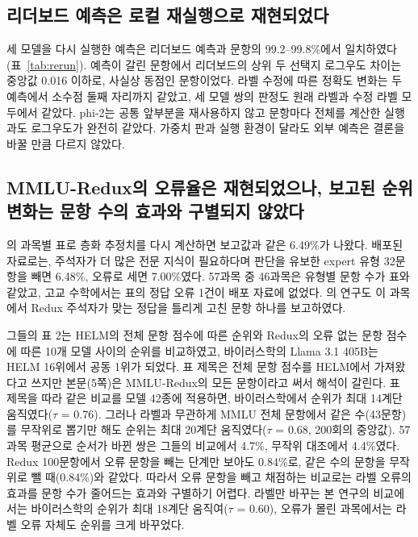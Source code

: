 \documentclass[11pt]{article}
\begin{document}
\subsection{리더보드 예측은 로컬 재실행으로 재현되었다}

\begin{table}[t]
\centering\small\setlength{\tabcolsep}{3.5pt}

\caption{리더보드 예측과 로컬 재실행 예측(5,690문항, float16, Apple 실리콘 GPU). 예측 일치는 로그우도가 가장 큰 선택지가 같은 문항의 비율, 로그우도 차이는 네 선택지 로그우도 차이의 절댓값 중앙값이다. 수정 후 변화는 $S$에서 수정 정답과 원래 정답 기준 정확도의 차이이다.}
\label{tab:rerun}
\end{table}

세 모델을 다시 실행한 예측은 리더보드 예측과 문항의 99.2--99.8\%에서 일치하였다(표~\ref{tab:rerun}). 예측이 갈린 문항에서 리더보드의 상위 두 선택지 로그우도 차이는 중앙값 0.016 이하로, 사실상 동점인 문항이었다. 라벨 수정에 따른 정확도 변화는 두 예측에서 소수점 둘째 자리까지 같았고, 세 모델 쌍의 판정도 원래 라벨과 수정 라벨 모두에서 같았다. phi-2는 공통 앞부분을 재사용하지 않고 문항마다 전체를 계산한 실행과도 로그우도가 완전히 같았다. 가중치 판과 실행 환경이 달라도 외부 예측은 결론을 바꿀 만큼 다르지 않았다.

\subsection{MMLU-Redux의 오류율은 재현되었으나, 보고된 순위 변화는 문항 수의 효과와 구별되지 않았다}

\citet{gema-etal-2025-done}의 과목별 표로 층화 추정치를 다시 계산하면 보고값과 같은 6.49\%가 나왔다. 배포된 자료로는, 주석자가 더 많은 전문 지식이 필요하다며 판단을 유보한 expert 유형 32문항을 빼면 6.48\%, 오류로 세면 7.00\%였다. 57과목 중 46과목은 유형별 문항 수가 표와 같았고, 고교 수학에서는 표의 정답 오류 1건이 배포 자료에 없었다. \citet{vendrow2025platinum}의 연구도 이 과목에서 Redux 주석자가 맞는 정답을 틀리게 고친 문항 하나를 보고하였다.

그들의 표 2는 HELM의 전체 문항 점수에 따른 순위와 Redux의 오류 없는 문항 점수에 따른 10개 모델 사이의 순위를 비교하였고, 바이러스학의 Llama 3.1 405B는 HELM 16위에서 공동 1위가 되었다. 표 제목은 전체 문항 점수를 HELM에서 가져왔다고 쓰지만 본문(5쪽)은 MMLU-Redux의 모든 문항이라고 써서 해석이 갈린다. 표 제목을 따라 같은 비교를 모델 42종에 적용하면, 바이러스학에서 순위가 최대 14계단 움직였다($\tau$ = 0.76). 그러나 라벨과 무관하게 MMLU 전체 문항에서 같은 수(43문항)를 무작위로 뽑기만 해도 순위는 최대 20계단 움직였다($\tau$ = 0.68, 200회의 중앙값). 57과목 평균으로 순서가 바뀐 쌍은 그들의 비교에서 4.7\%, 무작위 대조에서 4.4\%였다. Redux 100문항에서 오류 문항을 빼는 단계만 보아도 0.84\%로, 같은 수의 문항을 무작위로 뺄 때(0.84\%)와 같았다. 따라서 오류 문항을 빼고 채점하는 비교로는 라벨 오류의 효과를 문항 수가 줄어드는 효과와 구별하기 어렵다. 라벨만 바꾸는 본 연구의 비교에서는 바이러스학의 순위가 최대 18계단 움직여($\tau$ = 0.60), 오류가 몰린 과목에서는 라벨 오류 자체도 순위를 크게 바꾸었다.
\end{document}
